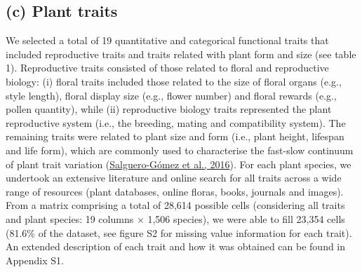 \documentclass[
  12pt,
  a4paper,
]{article}
\begin{document}
\hypertarget{c-plant-traits}{%
\subsection{(c) Plant traits}\label{c-plant-traits}}

We selected a total of 19 quantitative and categorical functional traits that included reproductive traits and traits related with plant form and size (see table 1). Reproductive traits consisted of those related to floral and reproductive biology: (i) floral traits included those related to the size of floral organs (e.g., style length), floral display size (e.g., flower number) and floral rewards (e.g., pollen quantity), while (ii) reproductive biology traits represented the plant reproductive system (i.e., the breeding, mating and compatibility system). The remaining traits were related to plant size and form (i.e., plant height, lifespan and life form), which are commonly used to characterise the fast-slow continuum of plant trait variation (\protect\hyperlink{ref-salguero2016}{Salguero-Gómez et al., 2016}). For each plant species, we undertook an extensive literature and online search for all traits across a wide range of resources (plant databases, online floras, books, journals and images). From a matrix comprising a total of 28,614 possible cells (considering all traits and plant species: 19 columns × 1,506 species), we were able to fill 23,354 cells (81.6\% of the dataset, see figure S2 for missing value information for each trait). An extended description of each trait and how it was obtained can be found in Appendix S1.

\singlespacing
\end{document}
